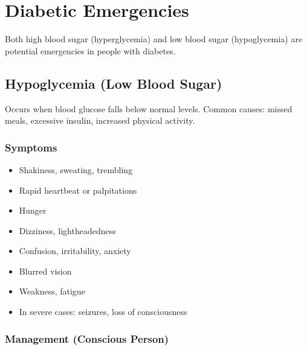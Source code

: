 \section{Diabetic Emergencies}

Both high blood sugar (hyperglycemia) and low blood sugar (hypoglycemia) are potential emergencies in people with diabetes.

\subsection{Hypoglycemia (Low Blood Sugar)}

Occurs when blood glucose falls below normal levels. Common causes: missed meals, excessive insulin, increased physical activity.

\subsubsection{Symptoms}

\begin{itemize}[leftmargin=*]
  \item Shakiness, sweating, trembling
  \item Rapid heartbeat or palpitations
  \item Hunger
  \item Dizziness, lightheadedness
  \item Confusion, irritability, anxiety
  \item Blurred vision
  \item Weakness, fatigue
  \item In severe cases: seizures, loss of consciousness
\end{itemize}

\subsubsection{Management (Conscious Person)}

